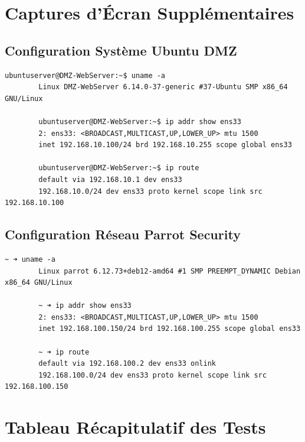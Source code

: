 \documentclass[12pt,a4paper,openany]{report}
\begin{document}
	\section{Captures d'Écran Supplémentaires}
	
	\subsection{Configuration Système Ubuntu DMZ}
	\begin{lstlisting}[caption=Informations Système du Serveur DMZ]
		ubuntuserver@DMZ-WebServer:~$ uname -a
		Linux DMZ-WebServer 6.14.0-37-generic #37-Ubuntu SMP x86_64 GNU/Linux
		
		ubuntuserver@DMZ-WebServer:~$ ip addr show ens33
		2: ens33: <BROADCAST,MULTICAST,UP,LOWER_UP> mtu 1500
		inet 192.168.10.100/24 brd 192.168.10.255 scope global ens33
		
		ubuntuserver@DMZ-WebServer:~$ ip route
		default via 192.168.10.1 dev ens33
		192.168.10.0/24 dev ens33 proto kernel scope link src 192.168.10.100
	\end{lstlisting}
	
	\subsection{Configuration Réseau Parrot Security}
	\begin{lstlisting}[caption=Configuration Réseau de la Machine Attaquante]
		~ ➜ uname -a
		Linux parrot 6.12.73+deb12-amd64 #1 SMP PREEMPT_DYNAMIC Debian x86_64 GNU/Linux
		
		~ ➜ ip addr show ens33
		2: ens33: <BROADCAST,MULTICAST,UP,LOWER_UP> mtu 1500
		inet 192.168.100.150/24 brd 192.168.100.255 scope global ens33
		
		~ ➜ ip route
		default via 192.168.100.2 dev ens33 onlink
		192.168.100.0/24 dev ens33 proto kernel scope link src 192.168.100.150
	\end{lstlisting}
	
	\section{Tableau Récapitulatif des Tests}
	
\end{document}
